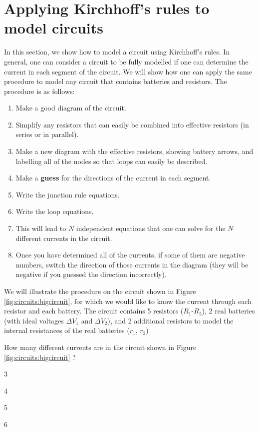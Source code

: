 \section{Applying Kirchhoff's rules to model circuits}
In this section, we show how to model a circuit using Kirchhoff's rules. In general, one can consider a circuit to be fully modelled if one can determine the current in each segment of the circuit. We will show how one can apply the same procedure to model any circuit that contains batteries and resistors. The procedure is as follows:
\begin{enumerate}
\item Make a good diagram of the circuit.
\item Simplify any resistors that can easily be combined into effective resistors (in series or in parallel).
\item Make a new diagram with the effective resistors, showing battery arrows, and labelling all of the nodes so that loops can easily be described.
\item Make a \textbf{guess} for the directions of the current in each segment.
\item Write the junction rule equations.
\item Write the loop equations.
\item This will lead to $N$ independent equations that one can solve for the $N$ different currents in the circuit.
\item Once you have determined all of the currents, if some of them are negative numbers, switch the direction of those currents in the diagram (they will be negative if you guessed the direction incorrectly).
\end{enumerate}

We will illustrate the procedure on the circuit shown in Figure \ref{fig:circuits:bigcircuit}, for which we would like to know the current through each resistor and each battery. The circuit contains 5 resistors ($R_1$-$R_5$), 2 real batteries (with ideal voltages $\Delta V_1$ and $\Delta V_2$), and 2 additional resistors to model the internal resistances of the real batteries ($r_1$, $r_2$)


\begin{checkpoint}{}
\begin{MCquestion}{How many different currents are in the circuit shown in Figure \ref{fig:circuits:bigcircuit} ?}
\item 3
\item 4
\item 5 \correct
\item 6
\end{MCquestion}
\end{checkpoint}

